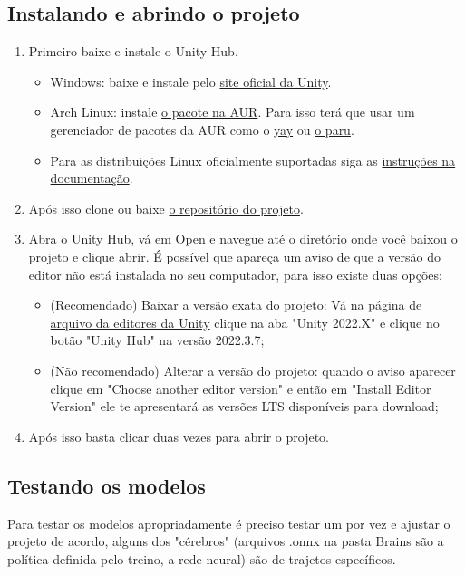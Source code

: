 \begin{apendicesenv}
\subsection*{Instalando e abrindo o projeto}

 \begin{enumerate}
    \item Primeiro baixe e instale o Unity Hub.
    \begin{itemize}
        \item Windows: baixe e instale pelo \href{https://unity.com/download}{site oficial da Unity}.
        \item Arch Linux: instale \href{https://aur.archlinux.org/packages/unityhub}{o pacote na AUR}. Para isso terá que usar um gerenciador de pacotes da AUR como o \href{https://github.com/Jguer/yay}{yay} ou \href{https://github.com/morganamilo/paru}{o paru}.
        \item Para as distribuições Linux oficialmente suportadas siga as \href{https://docs.unity3d.com/2020.1/Documentation/Manual/GettingStartedInstallingHub.html}{instruções na documentação}.
    \end{itemize}
    \item Após isso clone ou baixe \href{https://github.com/antunesvitor/SimuladorDeConducao}{o repositório do projeto}.
    \item Abra o Unity Hub, vá em Open e navegue até o diretório onde você baixou o projeto e clique abrir. É possível que apareça um aviso de que a versão do editor não está instalada no seu computador, para isso existe duas opções:
    \begin{itemize}
        \item (Recomendado) Baixar a versão exata do projeto: Vá na \href{https://unity.com/releases/editor/archive}{página de arquivo da editores da Unity} clique na aba "Unity 2022.X" e clique no botão  "Unity Hub" na versão 2022.3.7;
        \item (Não recomendado) Alterar a versão do projeto: quando o aviso aparecer clique em "Choose another editor version" e então em "Install Editor Version" ele te apresentará as versões LTS disponíveis para download;
    \end{itemize}
    \item Após isso basta clicar duas vezes para abrir o projeto.
 \end{enumerate}

\subsection*{Testando os modelos}
Para testar os modelos apropriadamente é preciso testar um por vez e ajustar o projeto de acordo, alguns dos "cérebros" (arquivos .onnx na pasta Brains são a política definida pelo treino, a rede neural) são de trajetos específicos.


\end{apendicesenv}
